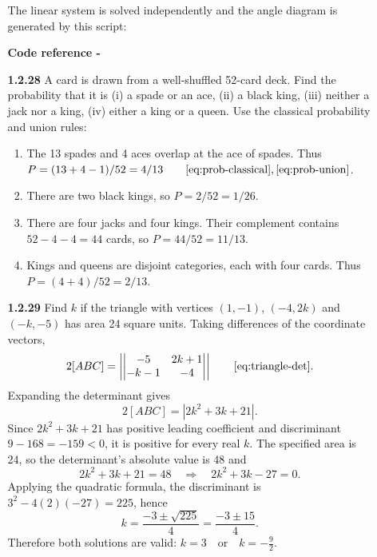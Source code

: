 \begin{enumerate}[label={},leftmargin=0pt]
\begin{enumerate}[label={},leftmargin=0pt,itemsep=9pt]
The linear system is solved independently and the angle diagram is generated by this script:
\par\smallskip
\noindent\textbf{Code reference -}
\par\noindent{}
\par\smallskip
\setcounter{enumii}{28}
\setcounter{equation}{0}
\item[\textbf{1.2.28}] A card is drawn from a well-shuffled 52-card deck. Find the probability that it is (i) a spade or an ace, (ii) a black king, (iii) neither a jack nor a king, (iv) either a king or a queen.
\solution Use the classical probability and union rules:
\begin{enumerate}[label=(\roman*)]
\item The 13 spades and 4 aces overlap at the ace of spades. Thus $P=(13+4-1)/52=4/13\qquad\eqref{eq:prob-classical}, \eqref{eq:prob-union}$.
\item There are two black kings, so $P=2/52=1/26$.
\item There are four jacks and four kings. Their complement contains $52-4-4=44$ cards, so $P=44/52=11/13$.
\item Kings and queens are disjoint categories, each with four cards. Thus $P=(4+4)/52=2/13$.
\end{enumerate}

\setcounter{enumii}{29}
\setcounter{equation}{0}
\item[\textbf{1.2.29}] Find $k$ if the triangle with vertices $(1,-1)$, $(-4,2k)$ and $(-k,-5)$ has area 24 square units.
\solution Taking differences of the coordinate vectors,
\begin{equation}
2[ABC]=\left|\begin{vmatrix}-5&2k+1\\-k-1&-4\end{vmatrix}\right|\qquad\eqref{eq:triangle-det}.
\end{equation}
Expanding the determinant gives
\begin{equation}
2[ABC]=|2k^2+3k+21|.
\end{equation}
Since $2k^2+3k+21$ has positive leading coefficient and discriminant $9-168=-159<0$, it is positive for every real $k$. The specified area is 24, so the determinant's absolute value is 48 and
\begin{equation}
2k^2+3k+21=48\quad\Longrightarrow\quad2k^2+3k-27=0.
\end{equation}
Applying the quadratic formula, the discriminant is $3^2-4(2)(-27)=225$, hence
\begin{equation}
k=\frac{-3\pm\sqrt{225}}4=\frac{-3\pm15}4.
\end{equation}
Therefore both solutions are valid: $k=3\quad\text{or}\quad k=-\frac92$.




\end{enumerate}
\end{enumerate}
